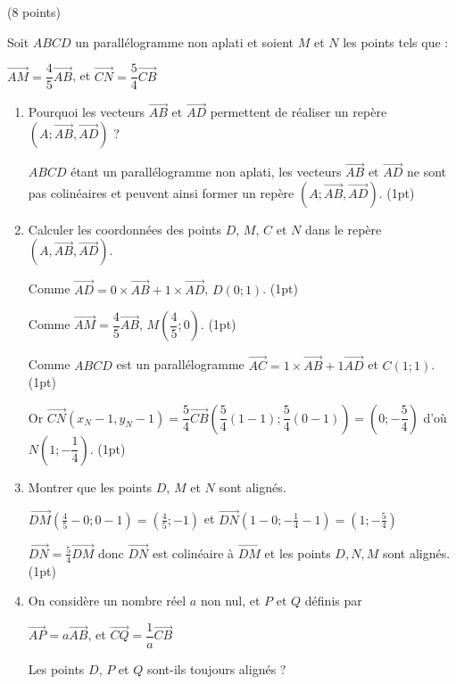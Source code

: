 \documentclass[a4paper,11pt]{article}
\theoremstyle{break}
\begin{document}
  
  \begin{exo}(8 points)
  ~
      \vspace{0.25cm}
      
      Soit $ABCD$ un parallélogramme non aplati et soient $M$ et $N$ les points tels que :
\begin{center} $\overrightarrow{AM}=\dfrac{4}{5}\overrightarrow{AB}$, \hspace{0.2cm} et $\overrightarrow{CN}=\dfrac{5}{4}\overrightarrow{CB}$ \end{center}
\begin{enumerate}
\item Pourquoi les vecteurs $\vec{AB}$ et $\vec{AD}$ permettent de réaliser un repère $(A;\vec{AB},\vec{AD})$ ?

\begin{correction}
  $ABCD$ \'etant un parall\'elogramme non aplati, les vecteurs $\vec{AB}$ et $\vec{AD}$ ne sont pas colin\'eaires et peuvent ainsi former un rep\`ere $(A;\vec{AB},\vec{AD})$.
  (1pt)
\end{correction}


\item Calculer les coordonnées des points $D$, $M$, $C$ et $N$ dans le repère $(A,\vec{AB},\vec{AD})$.

\begin{correction}
  Comme $\vec{AD}=0 \times \vec{AB}+ 1 \times \vec{AD}$, $D(0;1)$. (1pt)
  
  Comme $\vec{AM}=\dfrac{4}{5}\vec{AB}$, $M(\dfrac{4}{5};0)$. (1pt)
  
  Comme $ABCD$ est un parall\'elogramme $\vec{AC}=1 \times \vec{AB}+1 \vec{AD}$ et $C(1;1)$. (1pt)
  
  Or $\vec{CN}(x_N-1,y_N-1)=\dfrac{5}{4}\vec{CB}(\dfrac{5}{4}(1-1);\dfrac{5}{4}(0-1))=(0;-\dfrac{5}{4})$ d'o\`u $N(1;-\dfrac{1}{4})$. (1pt)
\end{correction}

\item Montrer que les points $D$, $M$ et $N$ sont alignés.

\begin{correction}
$\vec{DM}(\frac{4}{5}-0;0-1)=(\frac{4}{5};-1)$ et $\vec{DN}(1-0;-\frac{1}{4}-1)=(1;-\frac{5}{4})$

$\vec{DN}=\frac{5}{4}\vec{DM}$ donc $\vec{DN}$ est colin\'eaire \`a $\vec{DM}$ et les points $D,N,M$ sont align\'es. (1pt)
\end{correction}

\item On considère un nombre réel $a$ non nul, et $P$ et $Q$ définis par
      \begin{center} $\overrightarrow{AP}=a\overrightarrow{AB}$, \hspace{0.2cm} et $\overrightarrow{CQ}=\dfrac{1}{a}\overrightarrow{CB}$ \end{center}
      Les points $D$, $P$ et $Q$ sont-ils toujours alignés ?
      

\end{enumerate}
\end{exo}
\end{document}

